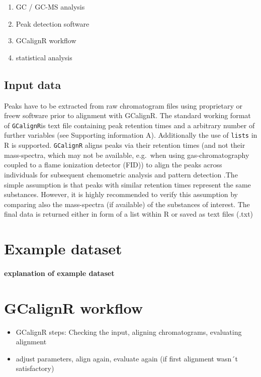 \documentclass[]{article}
\providecommand{\tightlist}{%
  \setlength{\itemsep}{0pt}\setlength{\parskip}{0pt}}
\let\oldparagraph\paragraph
\renewcommand{\paragraph}[1]{\oldparagraph{#1}\mbox{}}
\begin{document}
\begin{enumerate}
\def\labelenumi{\arabic{enumi}.}
\tightlist
\item
  GC / GC-MS analysis
\item
  Peak detection software
\item
  GCalignR workflow
\item
  statistical analysis
\end{enumerate}

\subsection{Input data}\label{input-data}

Peaks have to be extracted from raw chromatogram files using proprietary
or freew software prior to alignment with GCalignR. The standard working
format of \texttt{GCalignR}is text file containing peak retention times
and a arbitrary number of further variables (see Supporting information
A). Additionally the use of \texttt{lists} in R is supported.
\texttt{GCalignR} aligns peaks via their retention times (and not their
mass-spectra, which may not be available, e.g.~when using
gas-chromatography coupled to a flame ionization detector (FID)) to
align the peaks across individuals for subsequent chemometric analysis
and pattern detection .The simple assumption is that peaks with similar
retention times represent the same substances. However, it is highly
recommended to verify this assumption by comparing also the mass-spectra
(if available) of the substances of interest. The final data is returned
either in form of a list within R or saved as text files (.txt)

\section{Example dataset}\label{example-dataset}

\paragraph{explanation of example
dataset}\label{explanation-of-example-dataset}

\section{GCalignR workflow}\label{gcalignr-workflow}

\begin{itemize}
\tightlist
\item
  GCalignR steps: Checking the input, aligning chromatograms, evaluating
  alignment
\item
  adjust parameters, align again, evaluate again (if first alignment
  wasn´t satisfactory)
\end{itemize}
\end{document}
